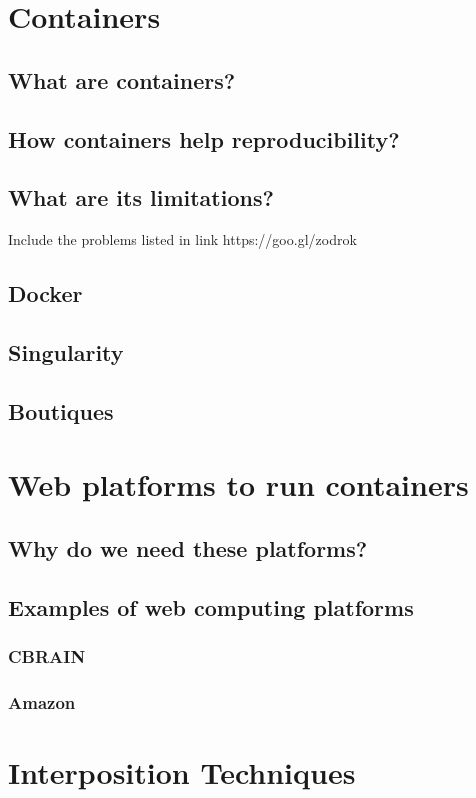\section{Containers}
\subsection{What are containers?}
\subsection{How containers help reproducibility?}
\subsection{What are its limitations?}
Include the problems listed in link https://goo.gl/zodrok
\subsection{Docker}
\subsection{Singularity}
\subsection{Boutiques}

\section{Web platforms to run containers}
\subsection{Why do we need these platforms?}
\subsection{Examples of web computing platforms}
\subsubsection{CBRAIN}
\subsubsection{Amazon}

\section{Interposition Techniques}
